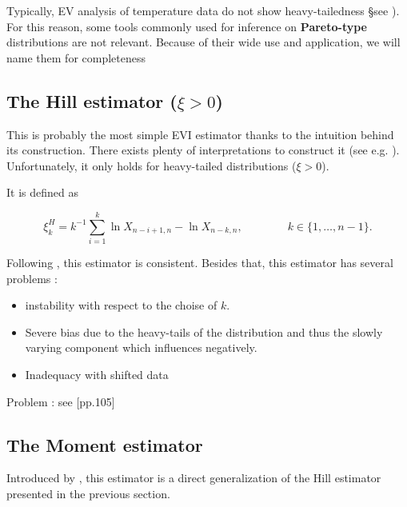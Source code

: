 \documentclass[11pt,a4paper,openany ]{book}
\begin{document}
Typically, EV analysis of temperature data do not show heavy-tailedness §see \citet{}). For this reason, some tools commonly used for inference on \textbf{Pareto-type} distributions are not relevant. Because of their wide use and application, we will name them for completeness


\subsection*{The Hill estimator ($\xi>0$)}


This is probably the most simple EVI estimator thanks to the intuition behind its construction. There exists plenty of interpretations to construct it (see e.g. \citet[pp.101-104]{beirlant_statistics_2006}). Unfortunately, it only holds for heavy-tailed distributions ($\xi>0$). 




It is defined as 

\begin{equation}
\xi^H_{k}=k^{-1}\sum_{i=1}^k\ln X_{n-i+1,n}-\ln X_{n-k,n}, \qquad\qquad k\in\{1,\dots,n-1\}.
\end{equation}



Following \cite{mason_}, this estimator is consistent. Besides that, this estimator has several problems : 

\begin{itemize}
	\item instability with respect to the choise of $k$.
	\item Severe bias due to the heavy-tails of the distribution and thus the slowly varying component which influences negatively.
	\item Inadequacy with shifted data
\end{itemize}


Problem : see [pp.105]


\subsection*{The Moment estimator}

Introduced by \cite{dekkers_moment_1989}, this estimator is a direct generalization of the Hill estimator presented in the previous section. 
\end{document}
